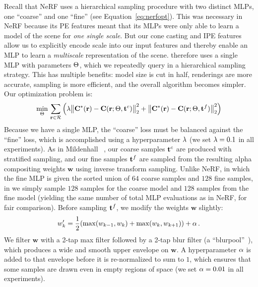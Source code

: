 \documentclass[10pt,twocolumn,letterpaper]{article}
\begin{document}
Recall that NeRF uses a hierarchical sampling procedure with two distinct MLPs, one ``coarse'' and one ``fine'' (see Equation~\ref{eq:nerfopt}). This was necessary in NeRF because its PE features meant that its MLPs were only able to learn a model of the scene for \emph{one single scale}.
But our cone casting and IPE features allow us to explicitly encode scale into our input features and thereby enable an MLP to learn a \emph{multiscale} representation of the scene. \shortmodelname therefore uses a single MLP with parameters $\Theta$, which we repeatedly query in a hierarchical sampling strategy. This has multiple benefits: model size is cut in half, renderings are more accurate, sampling is more efficient, and the overall algorithm becomes simpler.
Our optimization problem is:
\small
\begin{equation}
    \underset{\Theta}{\operatorname{min}}\, \sum_{\mathbf{r} \in \mathcal{R}} \Big( \lambda \big\| \mathbf{C}^*(\mathbf{r}) - \mathbf{C}(\mathbf{r}; \Theta, \mathbf{t}^{c}) \big\|_2^2 + \big\| \mathbf{C}^*(\mathbf{r}) - \mathbf{C}(\mathbf{r}; \Theta, \mathbf{t}^{f} ) \big\|_2^2 \Big)
\end{equation}
\normalsize
Because we have a single MLP, the ``coarse'' loss must be balanced against the ``fine'' loss, which is accomplished using a hyperparameter $\lambda$ (we set $\lambda=0.1$ in all experiments). As in Mildenhall \etal~\cite{mildenhall2020}, our coarse samples $\mathbf{t}^{c}$ are produced with stratified sampling, and our fine samples $\mathbf{t}^{f}$ are sampled from the resulting alpha compositing weights $\mathbf{w}$ using inverse transform sampling. 
Unlike NeRF, in which the fine MLP is given the sorted union of $64$ coarse samples and $128$ fine samples, in \shortmodelnamelower we simply sample $128$ samples for the coarse model and $128$ samples from the fine model (yielding the same number of total MLP evaluations as in NeRF, for fair comparison). Before sampling $\mathbf{t}^{f}$, we modify the weights $\mathbf{w}$ slightly:
\begin{equation}
w'_k = \frac{1}{2}\left(\max(w_{k-1}, w_{k}) + \max(w_{k}, w_{k+1})\right) + \dirichlet\,.
\end{equation}
We filter $\mathbf{w}$ with a 2-tap max filter followed by a 2-tap blur filter (a ``blurpool''~\cite{zhang2019making}), which produces a wide and smooth upper envelope on $\mathbf{w}$. A hyperparameter $\alpha$ is added to that envelope before it is re-normalized to sum to $1$, which ensures that some samples are drawn even in empty regions of space (we set $\alpha=0.01$ in all experiments).
\end{document}
